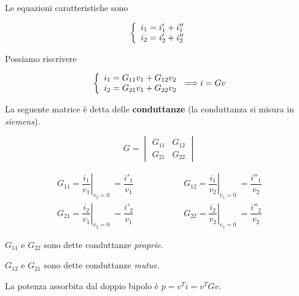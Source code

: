 \documentclass[a4paper]{report}
\begin{document}
Le equazioni caratteristiche sono

\[
\left\{
\begin{array}{l l}
  i_1=i'_1+i''_1\\
  i_2=i'_2+i''_2
\end{array}
\right.
\]

Possiamo riscrivere

\[
\left\{
\begin{array}{l l}
  i_1=G_{11}v_1+G_{12}v_2\\
  i_2=G_{21}v_1+G_{22}v_2
\end{array}
\right.\Longrightarrow i=Gv
\]

La seguente matrice \`e detta delle {\bf conduttanze} (la conduttanza
si misura in \emph{siemens}).

\[
G=
\begin{vmatrix}
  G_{11} & G_{12}\\
  G_{21} & G_{22}
\end{vmatrix}
\]

\vspace{0.5cm}

\[
\begin{matrix}
  G_{11}=\left. \dfrac{i_1}{v_1}\right|_{v_2=0} \ =\dfrac{i'_1}{v_1} &
  \quad \quad \quad \quad \quad
  G_{12}=\left. \dfrac{i_1}{v_2}\right|_{v_1=0} \ =\dfrac{i''_1}{v_2}\\[.5cm]
  G_{21}=\left. \dfrac{i_2}{v_1}\right|_{v_2=0} \ =\dfrac{i'_2}{v_1} &
  \quad \quad \quad \quad \quad
  G_{22}=\left. \dfrac{i_2}{v_2}\right|_{v_1=0} \ =\dfrac{i''_2}{v_2}
\end{matrix}
\]

\vspace{0.5cm}

$G_{11}$ e $G_{22}$ sono dette conduttanze \emph{proprie}.

$G_{12}$ e $G_{21}$ sono dette conduttanze \emph{mutue}.

La potenza assorbita dal doppio bipolo \`e $p=v^Ti=v^TGv$.
\end{document}
